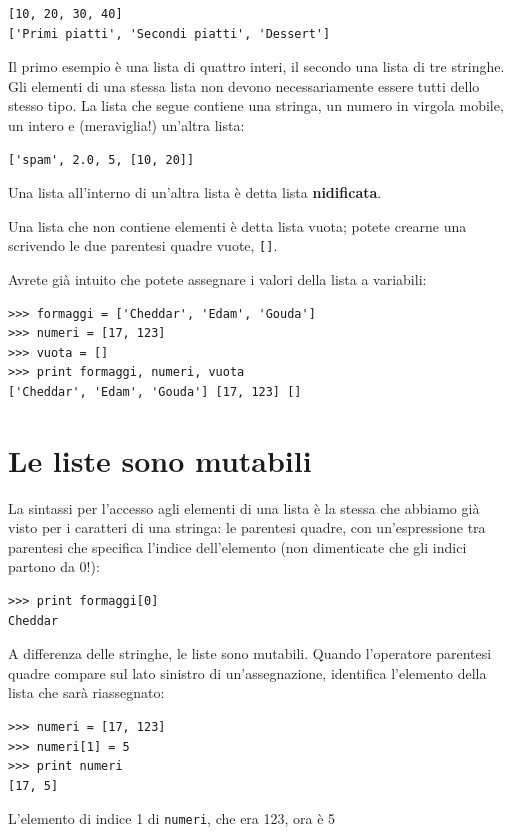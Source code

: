 \documentclass[10pt]{book}
\begin{document}
\begin{verbatim}
[10, 20, 30, 40]
['Primi piatti', 'Secondi piatti', 'Dessert']
\end{verbatim}
%
Il primo esempio è una lista di quattro interi, il secondo una lista
   di tre stringhe. Gli elementi di una stessa lista non devono
   necessariamente essere tutti dello stesso tipo. La lista che segue
   contiene una stringa, un numero in virgola mobile, un intero e (meraviglia!) un'altra lista:

\begin{verbatim}
['spam', 2.0, 5, [10, 20]]
\end{verbatim}
%
Una lista all'interno di un'altra lista è detta lista {\bf nidificata}.

Una lista che non contiene elementi è detta lista vuota; potete crearne una scrivendo le due parentesi quadre vuote, \verb"[]".

Avrete già intuito che potete assegnare i valori della lista a variabili:

\begin{verbatim}
>>> formaggi = ['Cheddar', 'Edam', 'Gouda']
>>> numeri = [17, 123]
>>> vuota = []
>>> print formaggi, numeri, vuota
['Cheddar', 'Edam', 'Gouda'] [17, 123] []
\end{verbatim}
%


\section{Le liste sono mutabili}
\label{mutable}

La sintassi per l'accesso agli elementi di una lista è la stessa che abbiamo già visto per i caratteri di una stringa: le parentesi quadre, con un'espressione tra parentesi che specifica l'indice dell'elemento (non dimenticate che gli indici partono da 0!):

\begin{verbatim}
>>> print formaggi[0]
Cheddar
\end{verbatim}
%
A differenza delle stringhe, le liste sono mutabili. Quando l'operatore parentesi quadre compare sul lato sinistro di un'assegnazione, identifica l'elemento della lista che sarà riassegnato:

\begin{verbatim}
>>> numeri = [17, 123]
>>> numeri[1] = 5
>>> print numeri
[17, 5]
\end{verbatim}
%
L'elemento di indice 1 di {\tt numeri}, che era 123, ora è 5
\end{document}
